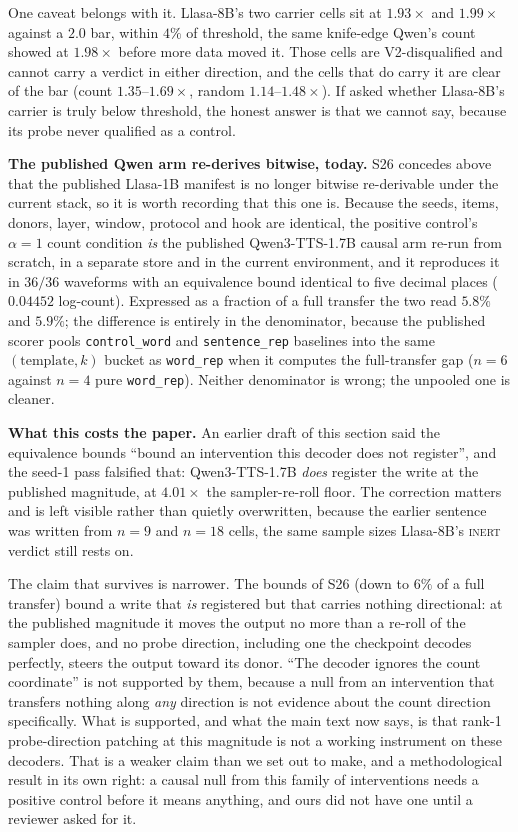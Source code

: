\documentclass[11pt]{article}
\begin{document}
One caveat belongs with it. Llasa-8B's two carrier cells sit at $1.93\times$ and
$1.99\times$ against a $2.0$ bar, within $4\%$ of threshold, the same
knife-edge Qwen's count showed at $1.98\times$ before more data moved it. Those
cells are V2-disqualified and cannot carry a verdict in either direction, and the
cells that do carry it are clear of the bar (count $1.35$--$1.69\times$, random
$1.14$--$1.48\times$). If asked whether Llasa-8B's carrier is truly below
threshold, the honest answer is that we cannot say, because its probe never
qualified as a control.

\textbf{The published Qwen arm re-derives bitwise, today.} S26 concedes above
that the published Llasa-1B manifest is no longer bitwise re-derivable under the
current stack, so it is worth recording that this one is. Because the seeds,
items, donors, layer, window, protocol and hook are identical, the positive
control's $\alpha{=}1$ count condition \emph{is} the published Qwen3-TTS-1.7B
causal arm re-run from scratch, in a separate store and in the current
environment, and it reproduces it in $36/36$ waveforms with an equivalence bound
identical to five decimal places ($0.04452$ log-count). Expressed as a fraction
of a full transfer the two read $5.8\%$ and $5.9\%$; the difference is entirely
in the denominator, because the published scorer pools \texttt{control\_word} and
\texttt{sentence\_rep} baselines into the same $(\text{template}, k)$ bucket as
\texttt{word\_rep} when it computes the full-transfer gap ($n{=}6$ against $n{=}4$
pure \texttt{word\_rep}). Neither denominator is wrong; the unpooled one is
cleaner.

\textbf{What this costs the paper.} An earlier draft of this section said the
equivalence bounds ``bound an intervention this decoder does not register'', and
the seed-1 pass falsified that: Qwen3-TTS-1.7B \emph{does} register the write at
the published magnitude, at $4.01\times$ the sampler-re-roll floor. The
correction matters and is left visible rather than quietly overwritten, because
the earlier sentence was written from $n{=}9$ and $n{=}18$ cells, the same
sample sizes Llasa-8B's \textsc{inert} verdict still rests on.

The claim that survives is narrower. The bounds of S26 (down to $6\%$ of a
full transfer) bound a write that \emph{is} registered but that carries
nothing directional: at the published magnitude it moves the output no more than
a re-roll of the sampler does, and no probe direction, including one the
checkpoint decodes perfectly, steers the output toward its donor. ``The decoder
ignores the count coordinate'' is not supported by them, because a null from an
intervention that transfers nothing along \emph{any} direction is not evidence
about the count direction specifically. What is supported, and what the main
text now says, is that rank-1 probe-direction patching at this magnitude is not
a working instrument on these decoders. That is a weaker claim than we set out to make,
and a methodological result in its own right: a causal null from this family of
interventions needs a positive control before it means anything, and ours did
not have one until a reviewer asked for it.
\end{document}
